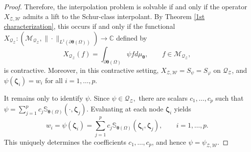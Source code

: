 \documentclass[10pt,a4paper]{amsart}
\begin{document}
\begin{proof}
    Therefore, the interpolation problem is solvable if and only if the operator $X_{\mathcal{Z},\mathcal{W}}$ admits a lift to the Schur-class interpolant.
    By Theorem \ref{1st characterization}, this occurs if and only if the functional 
    $X_{\mathcal{Q}_{\mathcal{Z}}}: \left(\mathcal{M}_{\mathcal{Q}_{\mathcal{Z}}}, \|\cdot \|_{L^1(\partial\boldsymbol \theta(\Omega))}\right) \to \mathbb C$ defined by $$X_{\mathcal{Q}_{\mathcal{Z}}}(f)=\int_{\partial\boldsymbol \theta(\Omega)} \psi f d\mu_{\boldsymbol \theta}, \qquad f\in \mathcal{M}_{\mathcal{Q}_{\mathcal{Z}}},$$
    is contractive.
    Moreover, in this contractive setting, $X_{\mathcal{Z}, \mathcal{W}} = S_{\psi} = S_{\varphi}$ on $\mathcal{Q}_{\mathcal{Z}}$, and $\psi(\boldsymbol{\zeta}_i) = w_i$ for all $i = 1, \ldots, p.$
    
    It remains only to identify $\psi.$ Since $\psi\in \mathcal{Q}_{\mathcal{Z}},$ there are scalars $c_1,\ldots,c_p$ such that $\psi=\sum_{j=1}^p c_j \mathbb S_{\boldsymbol \theta(\Omega)}(\cdot, \boldsymbol \zeta_j).$ Evaluating at each node $\boldsymbol \zeta_i$ yields
    $$ w_i=\psi(\boldsymbol \zeta_i)= \sum_{j=1}^p c_j \mathbb S_{\boldsymbol \theta(\Omega)}(\boldsymbol \zeta_i, \boldsymbol \zeta_j),\qquad i=1,\ldots,p.$$
    This uniquely determines the coefficients $c_1,\ldots, c_p$, and hence  $\psi=\psi_{\mathcal{Z,W}}.$
    \end{proof}
\end{document}
